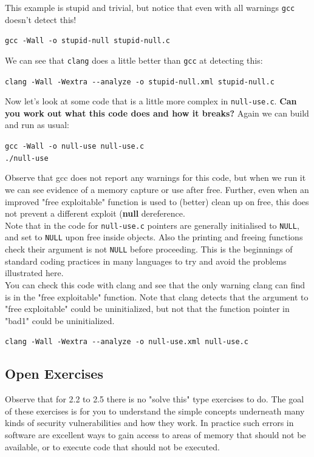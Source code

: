 \documentclass{article}
\begin{document}
\noindent This example is stupid and trivial, but notice that even with all warnings \lstinline{gcc} doesn't detect this!
\begin{center}
    \lstinline{gcc -Wall -o stupid-null stupid-null.c}
\end{center}
\noindent We can see that \lstinline{clang} does a little better than \lstinline{gcc} at detecting this:
\begin{center}
    \lstinline{clang -Wall -Wextra --analyze -o stupid-null.xml stupid-null.c}
\end{center}


\noindent Now let's look at some code that is a little more complex in \lstinline{null-use.c}.
\textbf{Can you work out what this code does and how it breaks?} Again we can build and run as usual:
\begin{center}
    \lstinline{gcc -Wall -o null-use null-use.c}\\
    \lstinline{./null-use}
\end{center}
Observe that gcc does not report any warnings for this code, but when we
run it we can see evidence of a memory capture or use after free. Further,
even when an improved "free exploitable" function is used to (better) clean
up on free, this does not prevent a different exploit (\textbf{null} dereference.\\

\noindent Note that in the code for  \lstinline{null-use.c} pointers are generally initialised to
\lstinline{NULL}, and set to \lstinline{NULL} upon free inside objects. Also the printing and
freeing functions check their argument is not \lstinline{NULL} before proceeding. This
is the beginnings of standard coding practices in many languages to try and
avoid the problems illustrated here.\\

\noindent You can check this code with clang and see that the only warning clang can find is in the "free exploitable"
function. Note that clang detects that the argument to "free exploitable"
could be uninitialized, but not that the function pointer in "bad1" could be
uninitialized.
\begin{center}
    \lstinline{clang -Wall -Wextra --analyze -o null-use.xml null-use.c}
\end{center}


\subsection{Open Exercises}
Observe that for 2.2 to 2.5 there is no "solve this" type exercises to do.
The goal of these exercises is for you to understand the simple concepts
underneath many kinds of security vulnerabilities and how they work. In
practice such errors in software are excellent ways to gain access to areas of
memory that should not be available, or to execute code that should not be
executed.\\
\end{document}
